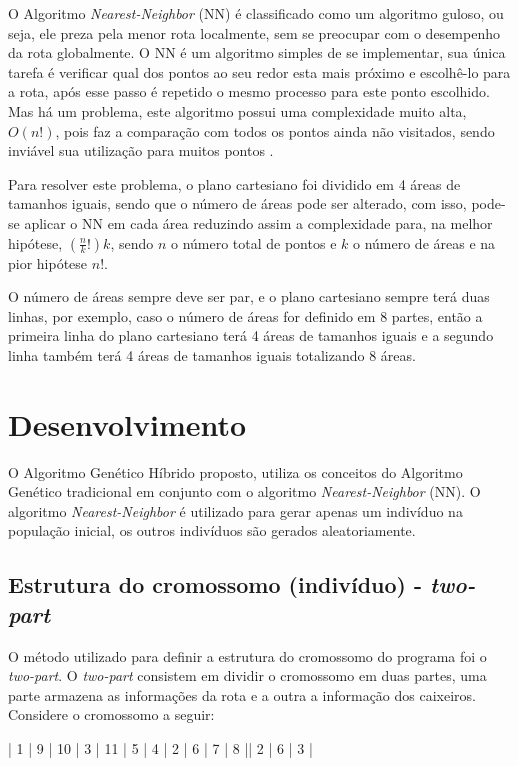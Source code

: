 \documentclass{abnt}
\begin{document}
			O Algoritmo \textit{Nearest-Neighbor} (NN) é classificado como um algoritmo guloso, ou seja, ele preza pela menor rota localmente, sem se preocupar com o desempenho da rota globalmente.
			O NN é um algoritmo simples de se implementar, sua única tarefa é verificar qual dos pontos ao seu redor esta mais próximo e escolhê-lo para a rota, após esse passo é repetido o mesmo processo para este ponto escolhido. Mas há um problema, este algoritmo possui uma complexidade muito alta, $O(n!)$, pois faz a comparação com todos os pontos ainda não visitados, sendo inviável sua utilização para muitos pontos \cite{NN}.
			
			Para resolver este problema, o plano cartesiano foi dividido em 4 áreas de tamanhos iguais, sendo que o número de áreas pode ser alterado, com isso, pode-se aplicar o NN em cada área reduzindo assim a complexidade para, na melhor hipótese, $(\frac{n}{k}!)k$, sendo $n$ o número total de pontos e $k$ o número de áreas e na pior hipótese $n!$. 
			
			O número de áreas sempre deve ser par, e o plano cartesiano sempre terá duas linhas, por exemplo, caso o número de áreas for definido em 8 partes, então a primeira linha do plano cartesiano terá 4 áreas de tamanhos iguais e a segundo linha também terá 4 áreas de tamanhos iguais totalizando 8 áreas.
		
		\chapter{Desenvolvimento}
		
		O Algoritmo Genético Híbrido proposto, utiliza os conceitos do Algoritmo Genético tradicional em conjunto com o algoritmo  \textit{Nearest-Neighbor} (NN). O algoritmo \textit{Nearest-Neighbor} é utilizado para gerar apenas um indivíduo na população inicial, os outros indivíduos são gerados aleatoriamente.
		
		
		\section{Estrutura do cromossomo (indivíduo) - \textit{two-part}}
		
			O método utilizado para definir a estrutura do cromossomo do programa foi o \textit{two-part}.
			O \textit{two-part} consistem em dividir o cromossomo em duas partes, uma parte armazena as informações da rota e a outra a informação dos caixeiros. Considere o cromossomo a seguir:

			\begin{center}
				| 1 | 9 | 10 | 3 | 11 | 5 | 4 | 2 | 6 | 7 | 8 || 2 | 6  | 3 |
			\end{center}
\end{document}
